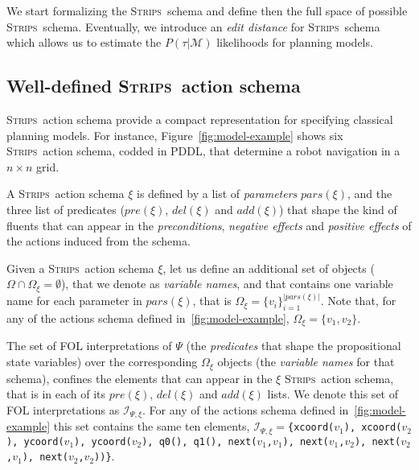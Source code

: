\documentclass[letterpaper]{article} %
\newcommand{\strips}{\textsc{Strips}}     %
\begin{document}
We start formalizing the \strips\ schema and define then the full space of possible \strips\ schema. Eventually, we introduce an {\em edit distance} for \strips\ schema which allows us to estimate the $P(\tau|\mathcal{M})$ likelihoods for planning models.

\subsection{Well-defined \strips\ action schema}
\strips\ action schema provide a compact representation for specifying classical planning models. For instance, Figure~\ref{fig:model-example} shows six \strips\ action schema, codded in PDDL, that determine a robot navigation in a $n\times n$ grid.

A \strips\ action schema $\xi$ is defined by a list of {\em parameters} $pars(\xi)$, and the three list of predicates ($pre(\xi)$, $del(\xi)$ and $add(\xi)$) that shape the kind of fluents that can appear in the {\em preconditions}, {\em negative effects} and {\em positive effects} of the actions induced from the schema. 

Given a \strips\ action schema $\xi$, let us define an additional set of objects ($\Omega\cap\Omega_\xi=\emptyset$), that we denote as {\em variable names}, and that contains one variable name for each parameter in $pars(\xi)$, that is $\Omega_\xi=\{v_i\}_{i=1}^{|pars(\xi)|}$. Note that, for any of the actions schema defined in~\ref{fig:model-example}, $\Omega_\xi=\{v_1,v_2\}$.

The set of FOL interpretations of $\Psi$ (the {\em predicates} that shape the propositional state variables) over the corresponding $\Omega_\xi$ objects (the {\em variable names} for that schema), confines the elements that can appear in the $\xi$ \strips\ action schema, that is in each of its $pre(\xi)$, $del(\xi)$ and $add(\xi)$ lists. We denote this set of FOL interpretations as ${\mathcal I}_{\Psi,\xi}$. For any of the actions schema defined in~\ref{fig:model-example} this set contains the same ten elements, ${\mathcal I}_{\Psi,\xi}=${\small\tt\{xcoord($v_1$), xcoord($v_2$), ycoord($v_1$), ycoord($v_2$), q0(), q1(), next($v_1$,$v_1$), next($v_1$,$v_2$), next($v_2$,$v_1$), next($v_2$,$v_2$))\}}.
\end{document}
